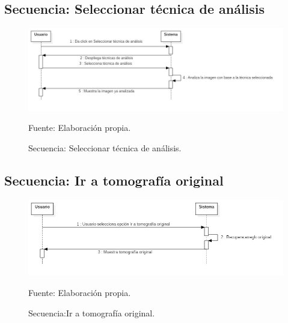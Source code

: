 \documentclass[12pt]{report}
\begin{document}
\subsection{Secuencia: Seleccionar técnica de análisis}
\begin{figure}[H]
\centering
\includegraphics[width = 12 cm, height = 7 cm]{analisis}
\caption{Secuencia: Seleccionar técnica de análisis.}
Fuente: Elaboración propia.
\end{figure}

\subsection{Secuencia: Ir a tomografía original}
\begin{figure}[H]
\centering
\includegraphics[width = 12 cm, height = 7 cm]{ir_a_tomografia}
\caption{Secuencia:Ir a tomografía original.}
Fuente: Elaboración propia.
\end{figure}
\end{document}
